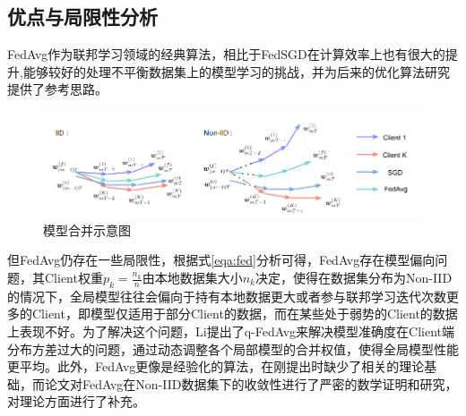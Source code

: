 \documentclass[zihao = -4,cn]{oucart}
\begin{document}
\subsection{优点与局限性分析}
FedAvg作为联邦学习领域的经典算法，相比于FedSGD在计算效率上也有很大的提升,能够较好的处理不平衡数据集上的模型学习的挑战，并为后来的优化算法研究提供了参考思路。\par
\begin{figure}[h]
\centering %
\includegraphics[scale=0.7]{assets/avg}
\caption{模型合并示意图}
\label{fig:wavg}
\end{figure}
但FedAvg仍存在一些局限性，根据式\ref{eqa:fed}分析可得，FedAvg存在模型偏向问题，其Client权重$p_k=\frac{n_k}{n}$由本地数据集大小$n_k$决定，使得在数据集分布为Non-IID的情况下，全局模型往往会偏向于持有本地数据更大或者参与联邦学习迭代次数更多的Client，即模型仅适用于部分Client的数据，而在某些处于弱势的Client的数据上表现不好。为了解决这个问题，Li\cite{li2019fair}提出了q-FedAvg来解决模型准确度在Client端分布方差过大的问题，通过动态调整各个局部模型的合并权值，使得全局模型性能更平均。此外，FedAvg更像是经验化的算法，在刚提出时缺少了相关的理论基础，而论文\cite{li2019convergence}\cite{zhao2018federated}对FedAvg在Non-IID数据集下的收敛性进行了严密的数学证明和研究，对理论方面进行了补充。\par
\end{document}
